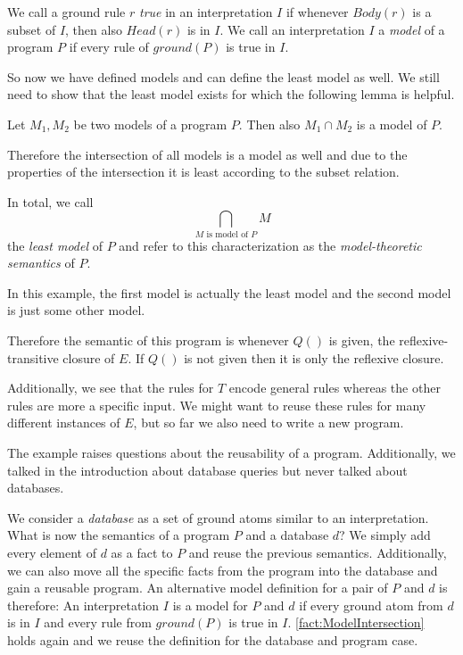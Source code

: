 We call a ground rule $r$ \textit{true} in an interpretation $I$ if whenever $Body(r)$ is a subset of $I$, then also $Head(r)$ is in $I$.  We call an interpretation $I$ a \textit{model} of a program $P$ if every rule of $ground(P)$ is true in $I$.

So now we have defined models and can define the least model as well. We still need to show that the least model exists for which the following lemma is helpful.

\begin{fact}\label{fact:ModelIntersection}
Let $M_1, M_2$ be two models of a program $P$. Then also $M_1 \cap M_2$ is a model of $P$.
\end{fact}

Therefore the intersection of all models is a model as well and due to the properties of the intersection it is least according to the subset relation. 

In total, we call \[\bigcap_{\text{$M$ is model of $P$}} M\] the \textit{least model} of $P$ and refer to this characterization as the \textit{model-theoretic semantics} of $P$.

\begin{contexample}
    In this example, the first model is actually the least model and the second model is just some other model.

    Therefore the semantic of this program is whenever $Q()$ is given, the reflexive-transitive closure of $E$. 
    If $Q()$ is not given then it is only the reflexive closure.

    Additionally, we see that the rules for $T$ encode general rules whereas the other rules are more a specific input. We might want to reuse these rules for many different instances of $E$, but so far we also need to write a new program.
\end{contexample}

The example raises questions about the reusability of a program. Additionally, we talked in the introduction about database queries but never talked about databases. 

We consider a \textit{database} as a set of ground atoms similar to an interpretation. What is now the semantics of a program $P$ and a database $d$? We simply add every element of $d$ as a fact to $P$ and reuse the previous semantics. Additionally, we can also move all the specific facts from the program into the database and gain a reusable program.
An alternative model definition for a pair of $P$ and $d$ is therefore: An interpretation $I$ is a model for $P$ and $d$ if every ground atom from $d$ is in $I$ and every rule from $ground(P)$ is true in $I$. \cref{fact:ModelIntersection} holds again and we reuse the definition for the database and program case.

